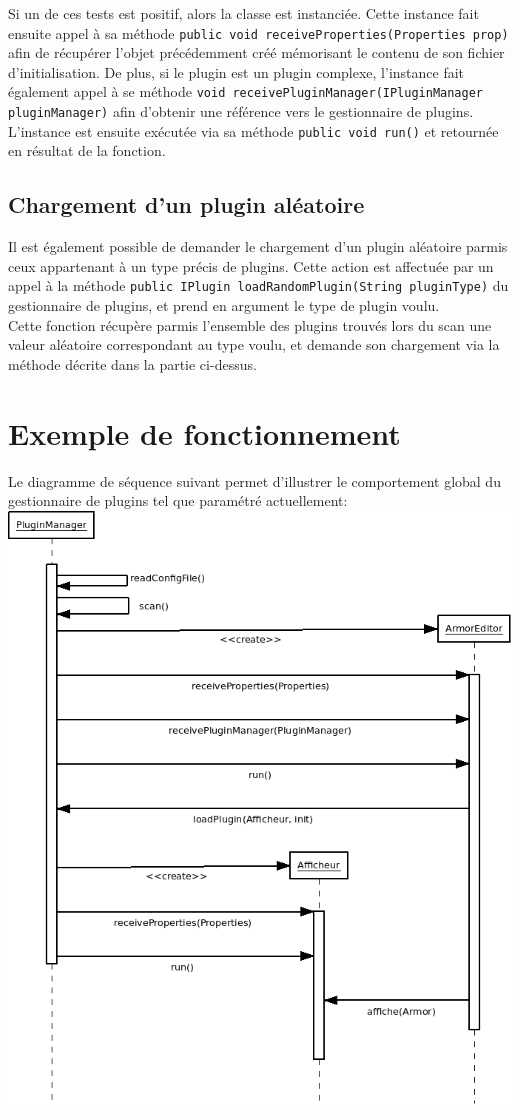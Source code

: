 Si un de ces tests est positif, alors la classe est instanciée. Cette instance fait ensuite appel à sa méthode \texttt{public void receiveProperties(Properties prop)} afin de récupérer l'objet précédemment créé mémorisant le contenu de son fichier d'initialisation. De plus, si le plugin est un plugin complexe, l'instance fait également appel à se méthode \texttt{void receivePluginManager(IPluginManager pluginManager)} afin d'obtenir une référence vers le gestionnaire de plugins. L'instance est ensuite exécutée via sa méthode \texttt{public void run()} et retournée en résultat de la fonction.

\subsection{Chargement d'un plugin aléatoire}

Il est également possible de demander le chargement d'un plugin aléatoire parmis ceux appartenant à un type précis de plugins. Cette action est affectuée par un appel à la méthode \texttt{public IPlugin loadRandomPlugin(String pluginType)} du gestionnaire de plugins, et prend en argument le type de plugin voulu.\\

Cette fonction récupère parmis l'ensemble des plugins trouvés lors du scan une valeur aléatoire correspondant au type voulu, et demande son chargement via la méthode décrite dans la partie ci-dessus.

\section{Exemple de fonctionnement}

Le diagramme de séquence suivant permet d'illustrer le comportement global du gestionnaire de plugins tel que paramétré actuellement:\\

\includegraphics[width=\textwidth]{../figures/SeqLoadPlugin.png}
